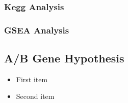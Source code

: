 \documentclass[fleqn,10pt]{wlscirep}
\begin{document}
\subsubsection{Kegg Analysis}

\subsubsection{GSEA Analysis}

\subsection*{A/B Gene Hypothesis}

\begin{itemize}
\item First item
\item Second item
\end{itemize}



\end{document}
